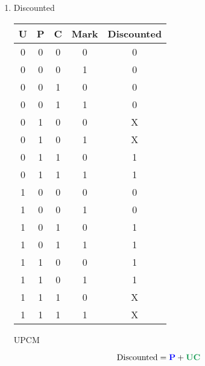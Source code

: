 \documentclass{article}
\newenvironment{solution}{\begin{mdframed}[style=SolutionFrame]}{\end{mdframed}}
\newenvironment{enum}{\begin{enumerate}[label={(\alph*)}]}{\end{enumerate}}
\begin{document}
    \begin{enum}
        \item Discounted
            \begin{solution}
                \begin{center}
                    \begin{tabular}{c|c|c|c||c}
                        U & P & C & Mark & Discounted \\ \hline
                        0 & 0 & 0 & 0 & 0 \\ \hline
                        0 & 0 & 0 & 1 & 0 \\ \hline
                        0 & 0 & 1 & 0 & 0 \\ \hline
                        0 & 0 & 1 & 1 & 0 \\ \hline
                        0 & 1 & 0 & 0 & X \\ \hline
                        0 & 1 & 0 & 1 & X \\ \hline
                        0 & 1 & 1 & 0 & 1 \\ \hline
                        0 & 1 & 1 & 1 & 1 \\ \hline
                        1 & 0 & 0 & 0 & 0 \\ \hline
                        1 & 0 & 0 & 1 & 0 \\ \hline
                        1 & 0 & 1 & 0 & 1 \\ \hline
                        1 & 0 & 1 & 1 & 1 \\ \hline
                        1 & 1 & 0 & 0 & 1 \\ \hline
                        1 & 1 & 0 & 1 & 1 \\ \hline
                        1 & 1 & 1 & 0 & X \\ \hline
                        1 & 1 & 1 & 1 & X \\ \hline
                    \end{tabular}
                    \vfill
                    
                    \begin{Karnaugh4}{U}{P}{C}{M}

                    \end{Karnaugh4}
                    $$\text{Discounted}=\textcolor{blue}{\mathbf{P}}+\textcolor{ForestGreen}{\mathbf{UC}}$$
                \end{center}
            \end{solution}


\end{enum}
\end{document}
